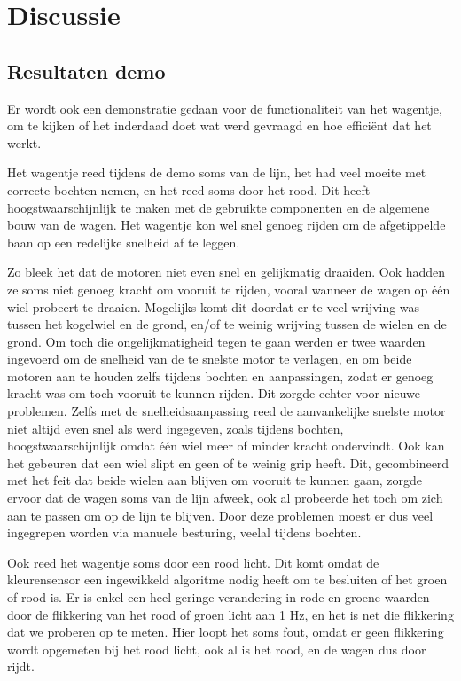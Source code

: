 \documentclass[a4paper,twoside,kulak]{kulakreport} %
\begin{document}
\section{Discussie} %
\subsection{Resultaten demo}  %
Er wordt ook een demonstratie gedaan voor de functionaliteit van het wagentje, om te kijken of het inderdaad doet wat werd gevraagd en hoe efficiënt dat het werkt.

Het wagentje reed tijdens de demo soms van de lijn, het had veel moeite met correcte bochten nemen, en het reed soms door het rood. Dit heeft hoogstwaarschijnlijk te maken met de gebruikte componenten en de algemene bouw van de wagen. Het wagentje kon wel snel genoeg rijden om de afgetippelde baan op een redelijke snelheid af te leggen.

Zo bleek het dat de motoren niet even snel en gelijkmatig draaiden. Ook hadden ze soms niet genoeg kracht om vooruit te rijden, vooral wanneer de wagen op één wiel probeert te draaien. Mogelijks komt dit doordat er te veel wrijving was tussen het kogelwiel en de grond, en/of te weinig wrijving tussen de wielen en de grond. Om toch die ongelijkmatigheid tegen te gaan werden er twee waarden ingevoerd om de snelheid van de te snelste motor te verlagen, en om beide motoren aan te houden zelfs tijdens bochten en aanpassingen, zodat er genoeg kracht was om toch vooruit te kunnen rijden. Dit zorgde echter voor nieuwe problemen. Zelfs met de snelheidsaanpassing reed de aanvankelijke snelste motor niet altijd even snel als werd ingegeven, zoals tijdens bochten, hoogstwaarschijnlijk omdat één wiel meer of minder kracht ondervindt. Ook kan het gebeuren dat een wiel slipt en geen of te weinig grip heeft. Dit, gecombineerd met het feit dat beide wielen aan blijven om vooruit te kunnen gaan, zorgde ervoor dat de wagen soms van de lijn afweek, ook al probeerde het toch om zich aan te passen om op de lijn te blijven. Door deze problemen moest er dus veel ingegrepen worden via manuele besturing, veelal tijdens bochten.

Ook reed het wagentje soms door een rood licht. Dit komt omdat de kleurensensor een ingewikkeld algoritme nodig heeft om te besluiten of het groen of rood is. Er is enkel een heel geringe verandering in rode en groene waarden door de flikkering van het rood of groen licht aan 1 Hz, en het is net die flikkering dat we proberen op te meten. Hier loopt het soms fout, omdat er geen flikkering wordt opgemeten bij het rood licht, ook al is het rood, en de wagen dus door rijdt.
\end{document}
